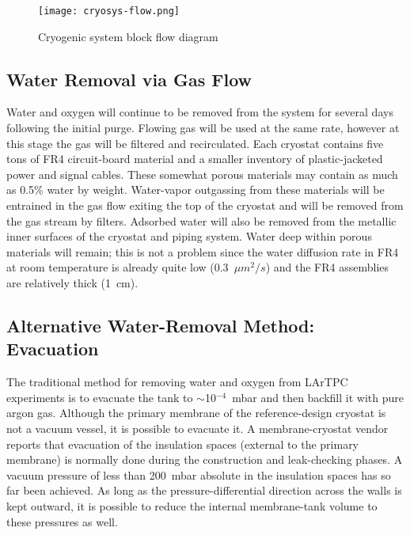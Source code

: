 \begin{figure}[htbp]
\centering
\texttt{[image: cryosys-flow.png]} 
\caption{Cryogenic system block flow diagram}
\label{fig:v5ch2-LBNF-cryo-process-2014}
\end{figure}



\subsection{Water Removal via Gas Flow}

Water and oxygen will continue to be removed from the system for several days following the
initial purge. Flowing gas will be used at the same rate, however at this stage the gas will
be filtered and recirculated. Each cryostat contains five tons of FR4
circuit-board material and a
smaller inventory of plastic-jacketed power and signal cables. These somewhat porous
materials may contain as much as 0.5\% water by weight. Water-vapor outgassing from these
materials will be entrained in the gas flow exiting
the top of the cryostat and will be removed
from the gas stream by filters. Adsorbed water will also be removed from the metallic inner
surfaces of the cryostat and piping system. Water deep within porous materials will remain;
this is not a problem since
the water diffusion rate in FR4 at room temperature is already quite low (0.3~$\mu m^2 /s$) and the FR4 assemblies are relatively thick (1~cm).

\subsection{Alternative Water-Removal Method: Evacuation}

The traditional method for removing water and oxygen from LArTPC experiments is to evacuate the tank to $\sim$10$^{-4}$~mbar  and then backfill it with pure argon gas. Although the primary membrane of the reference-design cryostat is not a vacuum vessel, it is possible to evacuate it.  A membrane-cryostat vendor reports that evacuation of  the insulation spaces (external to the primary membrane) is normally done during the construction and leak-checking phases.  A vacuum pressure of less than 200~mbar absolute in the insulation spaces has so far been achieved.  As long as the pressure-differential direction across the walls is kept outward, it is possible to reduce the internal membrane-tank volume to these pressures as well.  

